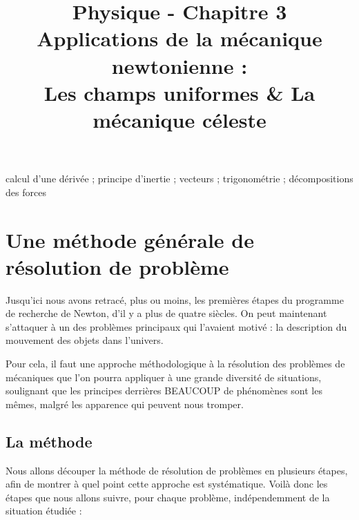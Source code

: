 \documentclass[11pt,a4paper]{article}
\title{\large Physique - Chapitre 3 \\ \LARGE Applications de la mécanique newtonienne :  \\ \large Les champs uniformes \& La mécanique céleste}
\date{}
\author{}
\begin{document}
\maketitle
\vspace{-1cm}
\begin{tcolorbox}[title=Notions de la classe de première à rappeler]
calcul d'une dérivée ; principe d'inertie ; vecteurs ; trigonométrie ; décompositions des forces
\end{tcolorbox}
\tableofcontents

\section{Une méthode générale de résolution de problème}

Jusqu’ici nous avons retracé, plus ou moins, les premières étapes du programme de recherche de Newton, d’il y a plus de quatre siècles. On peut maintenant s’attaquer à un des problèmes principaux qui l’avaient motivé : la description du mouvement des objets dans l’univers. 

Pour cela, il faut une approche méthodologique à la résolution des problèmes de mécaniques que l'on pourra appliquer à une grande diversité de situations, soulignant que les principes derrières BEAUCOUP de phénomènes sont les mêmes, malgré les apparence qui peuvent nous tromper. 
\newpage

\subsection{La méthode}

Nous allons découper la méthode de résolution de problèmes en plusieurs étapes, afin de montrer à quel point cette approche est systématique. Voilà donc les étapes que nous allons suivre, pour chaque problème, indépendemment de la situation étudiée : 
\end{document}
